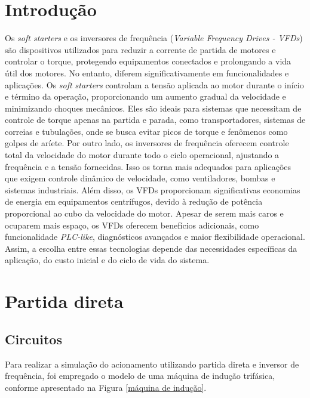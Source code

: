 \documentclass[a4paper, 11pt]{article}
\begin{document}
    \newpage
\section{Introdução}
  
Os \textit{soft starters} e os inversores de frequência (\textit{Variable Frequency Drives - VFDs}) são dispositivos utilizados para reduzir a corrente de partida de motores e controlar o torque, protegendo equipamentos conectados e prolongando a vida útil dos motores. No entanto, diferem significativamente em funcionalidades e aplicações. Os \textit{soft starters} controlam a tensão aplicada ao motor durante o início e término da operação, proporcionando um aumento gradual da velocidade e minimizando choques mecânicos. Eles são ideais para sistemas que necessitam de controle de torque apenas na partida e parada, como transportadores, sistemas de correias e tubulações, onde se busca evitar picos de torque e fenômenos como golpes de aríete. Por outro lado, os inversores de frequência oferecem controle total da velocidade do motor durante todo o ciclo operacional, ajustando a frequência e a tensão fornecidas. Isso os torna mais adequados para aplicações que exigem controle dinâmico de velocidade, como ventiladores, bombas e sistemas industriais. Além disso, os VFDs proporcionam significativas economias de energia em equipamentos centrífugos, devido à redução de potência proporcional ao cubo da velocidade do motor. Apesar de serem mais caros e ocuparem mais espaço, os VFDs oferecem benefícios adicionais, como funcionalidade \textit{PLC-like}, diagnósticos avançados e maior flexibilidade operacional. Assim, a escolha entre essas tecnologias depende das necessidades específicas da aplicação, do custo inicial e do ciclo de vida do sistema.
  
\section{Partida direta}

\subsection{Circuitos}

Para realizar a simulação do acionamento utilizando partida direta e inversor de frequência, foi empregado o modelo de uma máquina de indução trifásica, conforme apresentado na Figura \ref{máquina de indução}. 
\end{document}
